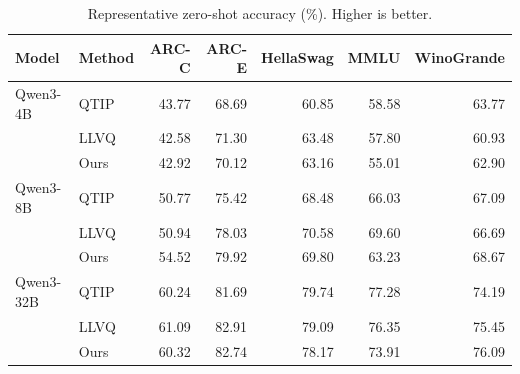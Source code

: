 \begin{table}[t]\centering\small
\caption{Representative zero-shot accuracy (\%). Higher is better.}
\label{tab:downstream-v20}
\begin{tabular}{llrrrrr}\toprule
Model & Method & ARC-C & ARC-E & HellaSwag & MMLU & WinoGrande\\\midrule
Qwen3-4B & QTIP & 43.77 & 68.69 & 60.85 & 58.58 & 63.77\\
 & LLVQ & 42.58 & 71.30 & 63.48 & 57.80 & 60.93\\
 & Ours & 42.92 & 70.12 & 63.16 & 55.01 & 62.90\\\midrule
Qwen3-8B & QTIP & 50.77 & 75.42 & 68.48 & 66.03 & 67.09\\
 & LLVQ & 50.94 & 78.03 & 70.58 & 69.60 & 66.69\\
 & Ours & 54.52 & 79.92 & 69.80 & 63.23 & 68.67\\\midrule
Qwen3-32B & QTIP & 60.24 & 81.69 & 79.74 & 77.28 & 74.19\\
 & LLVQ & 61.09 & 82.91 & 79.09 & 76.35 & 75.45\\
 & Ours & 60.32 & 82.74 & 78.17 & 73.91 & 76.09\\\bottomrule
\end{tabular}\end{table}
